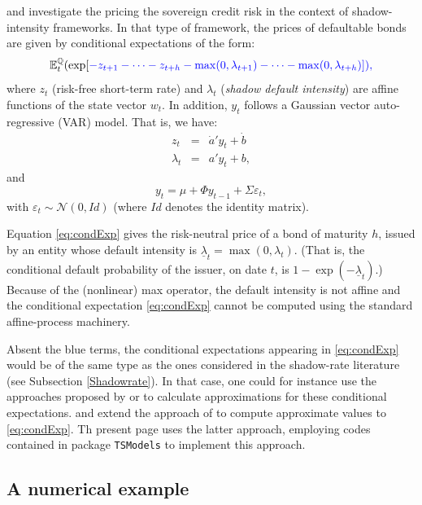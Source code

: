 \documentclass[
  12pt,
]{book}
\theoremstyle{definition}
\theoremstyle{definition}
\theoremstyle{definition}
\theoremstyle{definition}
\theoremstyle{remark}
\begin{document}
\citet{Pallara_Renne_2023} and \citet{Renne_Pallara_2023} investigate the pricing the sovereign credit risk in the context of shadow-intensity frameworks. In that type of framework, the prices of defaultable bonds are given by conditional expectations of the form:
\begin{equation}
\mathbb{E}^{\mathbb{Q}}_t(\exp[\color{blue}{-z_{t+1}-\dots-z_{t+h}}-\max(0,\lambda_{t+1})-\dots -\max(0,\lambda_{t+h})]),\label{eq:condExp}
\end{equation}
where \(z_t\) (risk-free short-term rate) and \(\lambda_t\) (\emph{shadow default intensity}) are affine functions of the state vector \(w_t\). In addition, \(y_t\) follows a Gaussian vector auto-regressive (VAR) model. That is, we have:
\begin{eqnarray*}
z_t &=& \dot{a}'y_t + \dot{b}\\
\lambda_t &=& a'y_t + b,
\end{eqnarray*}
and
\begin{equation}
y_t = \mu + \Phi y_{t-1}+ \Sigma\varepsilon_t,\label{eq:var}
\end{equation}
with \(\varepsilon_t \sim \mathcal{N}(0,Id)\) (where \(Id\) denotes the identity matrix).

Equation \eqref{eq:condExp} gives the risk-neutral price of a bond of maturity \(h\), issued by an entity whose default intensity is \(\underline{\lambda}_t = \max(0,\lambda_t)\). (That is, the conditional default probability of the issuer, on date \(t\), is \(1-\exp(-\underline{\lambda}_t)\).) Because of the (nonlinear) max operator, the default intensity is not affine and the conditional expectation \eqref{eq:condExp} cannot be computed using the standard affine-process machinery.

Absent the blue terms, the conditional expectations appearing in \eqref{eq:condExp} would be of the same type as the ones considered in the shadow-rate literature (see Subsection \ref{Shadowrate}). In that case, one could for instance use the approaches proposed by \citet{Priebsch_2013} or \citet{Wu_Xia_2016} to calculate approximations for these conditional expectations. \citet{Pallara_Renne_2023} and \citet{Renne_Pallara_2023} extend the approach of \citet{Wu_Xia_2016} to compute approximate values to \eqref{eq:condExp}. Th present page uses the latter approach, employing codes contained in package \texttt{TSModels} to implement this approach.

\hypertarget{a-numerical-example}{%
\subsection{A numerical example}\label{a-numerical-example}}
\end{document}
